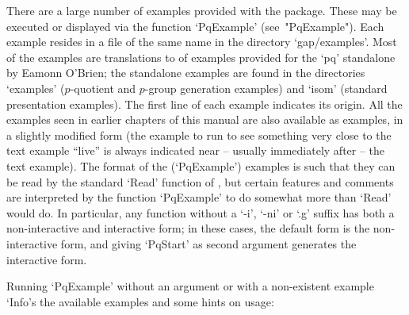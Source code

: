 

There are a large number of examples provided with the {\ANUPQ}  package.
These  may  be  executed  or  displayed  via  the  function   `PqExample'
(see~"PqExample"). Each example resides in a file of the same name in the
directory `gap/examples'. Most of the examples are translations to {\GAP}
of examples provided for the  `pq'  standalone  by  Eamonn  O'Brien;  the
standalone examples are found in the directories `examples' ($p$-quotient
and $p$-group generation  examples)  and  `isom'  (standard  presentation
examples). The first line of each example indicates its origin.  All  the
examples seen in earlier chapters of this manual are  also  available  as
examples, in a  slightly  modified  form  (the  example  to  run  to  see
something very close to the text example  ``live''  is  always  indicated
near -- usually immediately after -- the text example). The format of the
(`PqExample') examples is such that they can  be  read  by  the  standard
`Read'  function  of  {\GAP},  but  certain  features  and  comments  are
interpreted by the function `PqExample' to do somewhat more  than  `Read'
would do. In particular, any function  without  a  `-i',  `-ni'  or  `.g'
suffix has both a non-interactive and interactive form; in  these  cases,
the default form is the non-interactive form,  and  giving  `PqStart'  as
second argument generates the interactive form.

Running `PqExample' without an argument or with  a  non-existent  example
`Info's the available examples and some hints on usage:

